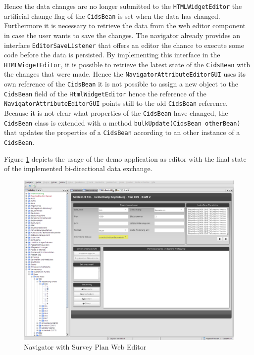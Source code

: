 Hence the data changes are no longer submitted to the \texttt{HTMLWidgetEditor} the artificial change flag of the \texttt{CidsBean} is set when the data has changed. 
Furthermore it is necessary to retrieve the data from the web editor component in case the user wants to save the changes. 
The navigator already provides an interface \texttt{EditorSaveListener} that offers an editor the chance to execute some code before the data is persisted. 
By implementing this interface in the \texttt{HTMLWidgetEditor}, it is possible to retrieve the latest state of the \texttt{CidsBean} with the changes that were made. 
Hence the \texttt{NavigatorAttributeEditorGUI} uses its own reference of the \texttt{CidsBean} it is not possible to assign a new object to the \texttt{CidsBean} field of the \texttt{HtmlWidgetEditor} hence the reference of the \texttt{NavigatorAttributeEditorGUI} points still to the old \texttt{CidsBean} reference. 
Because it is not clear what properties of the \texttt{CidsBean} have changed, the \texttt{CidsBean} class is extended with a method \texttt{bulkUpdate(CidsBean otherBean)} that updates the properties of a \texttt{CidsBean} according to an other  instance of a \texttt{CidsBean}. 

Figure \ref{fig:nav_web_editor} depicts the usage of the demo application as editor with the final state of the implemented bi-directional data exchange.

\begin{figure}
	\centering	\includegraphics[width=1.0\textwidth]{./img/impl/navigator_web_editor.png}
	\caption{Navigator with Survey Plan Web Editor}
	\label{fig:nav_web_editor}
\end{figure}


